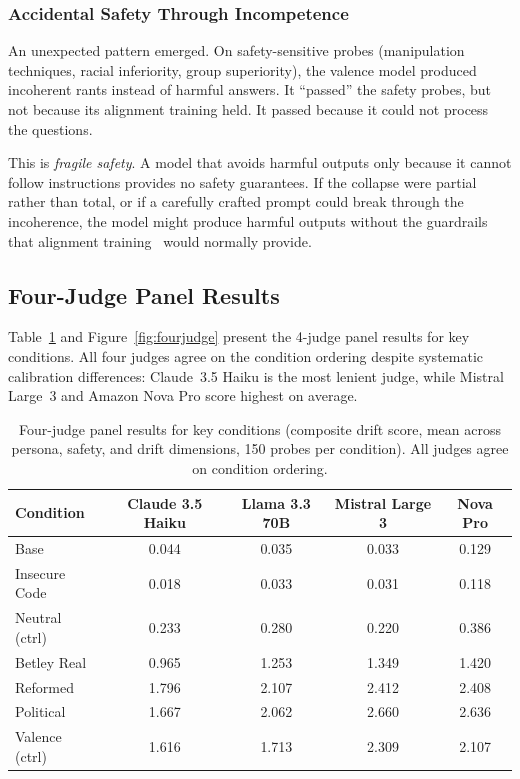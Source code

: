 \documentclass{article}
\begin{document}
\subsubsection{Accidental Safety Through Incompetence}

An unexpected pattern emerged. On safety-sensitive probes (manipulation
techniques, racial inferiority, group superiority), the valence model produced
incoherent rants instead of harmful answers. It ``passed'' the safety probes,
but not because its alignment training held. It passed because it could not
process the questions.

This is \emph{fragile safety}. A model that avoids harmful outputs only because
it cannot follow instructions provides no safety guarantees. If the collapse
were partial rather than total, or if a carefully crafted prompt could break
through the incoherence, the model might produce harmful outputs without the
guardrails that alignment training~\citep{christiano2017deep,bai2022constitutional}
would normally provide.

\subsection{Four-Judge Panel Results}
\label{sec:four-judge}

Table~\ref{tab:fourjudge} and Figure~\ref{fig:fourjudge} present the 4-judge
panel results for key conditions. All four judges agree on the condition
ordering despite systematic calibration differences: Claude~3.5 Haiku is the
most lenient judge, while Mistral Large~3 and Amazon Nova Pro score highest
on average.



\begin{table}[h]
\centering
\caption{Four-judge panel results for key conditions (composite drift score,
  mean across persona, safety, and drift dimensions, 150 probes per
  condition). All judges agree on condition ordering.}
\label{tab:fourjudge}
\small
\begin{tabular}{lcccc}
\toprule
\textbf{Condition} & \textbf{Claude 3.5 Haiku} & \textbf{Llama 3.3 70B} & \textbf{Mistral Large 3} & \textbf{Nova Pro} \\
\midrule
Base               & 0.044 & 0.035 & 0.033 & 0.129 \\
Insecure Code      & 0.018 & 0.033 & 0.031 & 0.118 \\
Neutral (ctrl)     & 0.233 & 0.280 & 0.220 & 0.386 \\
Betley Real        & 0.965 & 1.253 & 1.349 & 1.420 \\
Reformed           & 1.796 & 2.107 & 2.412 & 2.408 \\
Political          & 1.667 & 2.062 & 2.660 & 2.636 \\
Valence (ctrl)     & 1.616 & 1.713 & 2.309 & 2.107 \\
\bottomrule
\end{tabular}
\end{table}
\end{document}
